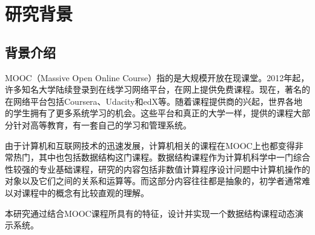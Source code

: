 \chapter{研究背景}

\section{背景介绍}
\begin{sectext}
MOOC（Massive Open Online Course）指的是大规模开放在现课堂。2012年起，许多知名大学陆续登录到在线学习网络平台，在网上提供免费课程。现在，著名的在网络平台包括Coursera、Udacity和edX等。随着课程提供商的兴起，世界各地的学生拥有了更多系统学习的机会。这些平台和真正的大学一样，提供的课程大部分针对高等教育，有一套自己的学习和管理系统。

由于计算机和互联网技术的迅速发展，计算机相关的课程在MOOC上也都变得非常热门，其中也包括数据结构这门课程。数据结构课程作为计算机科学中一门综合性较强的专业基础课程，研究的内容包括非数值计算程序设计问题中计算机操作的对象以及它们之间的关系和运算等。而这部分内容往往都是抽象的，初学者通常难以对课程中的概念有比较直观的理解。

本研究通过结合MOOC课程所具有的特征，设计并实现一个数据结构课程动态演示系统。
\end{sectext}
